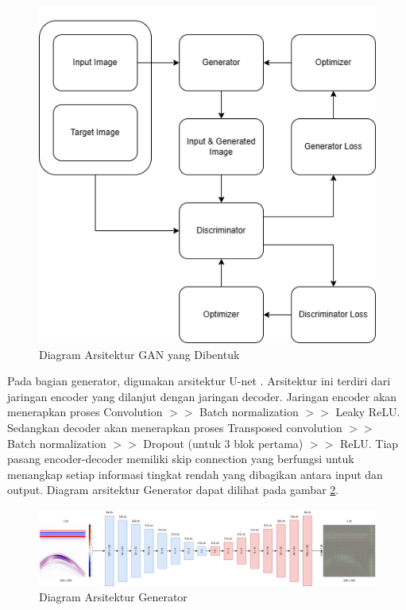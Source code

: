 \begin{figure}[ht]
  \centering
  \includegraphics[scale=0.5555]{gambar/Arsitektur GAN.png}
  \caption{Diagram Arsitektur GAN yang Dibentuk}
  \label{fig:arsitekturGAN}
\end{figure}

\newpage

Pada bagian generator, digunakan arsitektur U-net \parencite{UNet}. 
Arsitektur ini terdiri dari jaringan encoder yang dilanjut dengan jaringan decoder. 
Jaringan encoder akan menerapkan proses Convolution $>>$ Batch normalization $>>$ Leaky ReLU. 
Sedangkan decoder akan menerapkan proses Transposed convolution $>>$ Batch normalization $>>$ Dropout (untuk 3 blok pertama) $>>$ ReLU. 
Tiap pasang encoder-decoder memiliki skip connection yang berfungsi untuk menangkap setiap informasi tingkat rendah yang dibagikan antara input dan output. 
Diagram arsitektur Generator dapat dilihat pada gambar \ref{fig:generator}.

\begin{figure}[ht]
  \centering
  \includegraphics[scale=0.25]{gambar/Generator.png}
  \caption{Diagram Arsitektur Generator}
  \label{fig:generator}
\end{figure}

